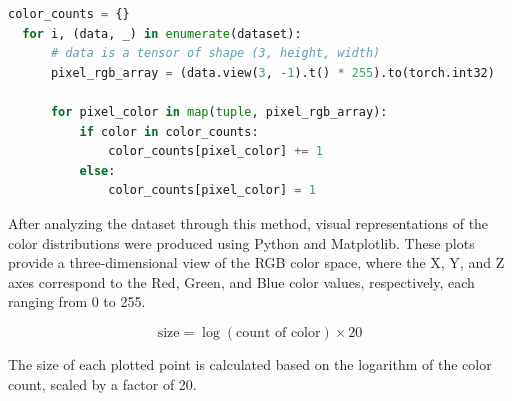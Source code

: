 \begin{lstlisting}[language=Python]
  color_counts = {} 
  for i, (data, _) in enumerate(dataset):
      # data is a tensor of shape (3, height, width) 
      pixel_rgb_array = (data.view(3, -1).t() * 255).to(torch.int32)
      
      for pixel_color in map(tuple, pixel_rgb_array):
          if color in color_counts:
              color_counts[pixel_color] += 1
          else:
              color_counts[pixel_color] = 1
\end{lstlisting}

    After analyzing the dataset through this method, visual representations of the color distributions were produced using Python and Matplotlib. These plots provide a three-dimensional view of the RGB color space, where the X, Y, and Z axes correspond to the Red, Green, and Blue color values, respectively, each ranging from 0 to 255. 

    \[
    \text{size} = \log(\text{count of color}) \times 20
    \]

    The size of each plotted point is calculated based on the logarithm of the color count, scaled by a factor of 20.
    
    

